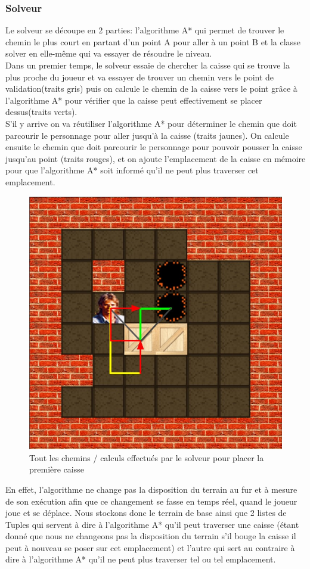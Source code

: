 \documentclass[a4paper,12pt]{article}
\begin{document}
\subsubsection{Solveur}
\label{section::solveur}
Le solveur se découpe en 2 parties: l'algorithme A* qui permet de trouver le chemin le plus court en partant d'un point A pour aller à un point B et la classe solver en elle-même qui va essayer de résoudre le niveau.\\
Dans un premier temps, le solveur essaie de chercher la caisse qui se trouve la plus proche du joueur et va essayer de trouver un chemin vers le point de validation(traits gris) puis on calcule le chemin de la caisse vers le point grâce à l’algorithme A* pour vérifier que la caisse peut effectivement se placer dessus(traits verts).\\
S'il y arrive on va réutiliser l'algorithme A* pour déterminer le chemin que doit parcourir le personnage pour aller jusqu'à la caisse (traits jaunes). On calcule ensuite le chemin que doit parcourir le personnage pour pouvoir pousser la caisse jusqu'au point (traits rouges), et on ajoute l'emplacement de la caisse en mémoire pour que l'algorithme A* soit informé qu'il ne peut plus traverser cet emplacement.

\begin{figure}[H]
\begin{center}
\includegraphics[width=0.6\linewidth]{./Illustrations/solver1.jpg}
\caption{Tout les chemins / calculs effectués par le solveur pour placer la première caisse}
\end{center}
\end{figure}

En effet, l’algorithme ne change pas la disposition du terrain au fur et à mesure de son exécution afin que ce changement se fasse en temps réel, quand le joueur joue et se déplace. Nous stockons donc le terrain de base ainsi que 2 listes de Tuples qui servent à dire à l’algorithme A* qu'il peut traverser une caisse (étant donné que nous ne changeons pas la disposition du terrain s'il bouge la caisse il peut à nouveau se poser sur cet emplacement) et l'autre qui sert au contraire à dire à l'algorithme A* qu'il ne peut plus traverser tel ou tel emplacement.\\
\end{document}
